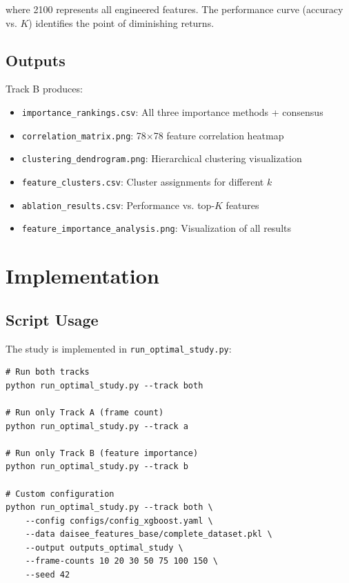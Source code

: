 \documentclass[11pt,a4paper]{article}
\begin{document}
where 2100 represents all engineered features. The performance curve (accuracy vs. $K$) identifies the point of diminishing returns.

\subsection{Outputs}

Track B produces:
\begin{itemize}
  \item \texttt{importance\_rankings.csv}: All three importance methods + consensus
  \item \texttt{correlation\_matrix.png}: 78$\times$78 feature correlation heatmap
  \item \texttt{clustering\_dendrogram.png}: Hierarchical clustering visualization
  \item \texttt{feature\_clusters.csv}: Cluster assignments for different $k$
  \item \texttt{ablation\_results.csv}: Performance vs. top-$K$ features
  \item \texttt{feature\_importance\_analysis.png}: Visualization of all results
\end{itemize}

\section{Implementation}\label{sec:implementation}

\subsection{Script Usage}

The study is implemented in \texttt{run\_optimal\_study.py}:

\begin{lstlisting}[caption={Basic Usage}]
# Run both tracks
python run_optimal_study.py --track both

# Run only Track A (frame count)
python run_optimal_study.py --track a

# Run only Track B (feature importance)
python run_optimal_study.py --track b

# Custom configuration
python run_optimal_study.py --track both \
    --config configs/config_xgboost.yaml \
    --data daisee_features_base/complete_dataset.pkl \
    --output outputs_optimal_study \
    --frame-counts 10 20 30 50 75 100 150 \
    --seed 42
\end{lstlisting}
\end{document}
